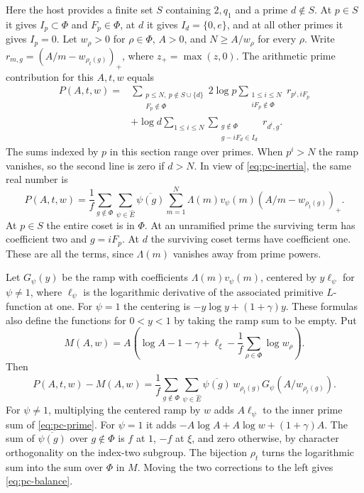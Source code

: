 Here the host provides a finite set \(S\) containing \(2,q_1\) and
a prime \(d\notin S\). At \(p\in S\) it gives \(I_p\subset\Phi\)
and \(F_p\in\Phi\), at \(d\) it gives \(I_d=\{0,e\}\), and at all
other primes it gives \(I_p=0\). Let \(w_\rho>0\) for \(\rho\in\Phi\),
\(A>0\), and \(N\geq A/w_\rho\) for every \(\rho\). Write
\(r_{m,g}=(A/m-w_{\rho_t(g)})_+\), where \(z_+=\max(z,0)\).
The arithmetic prime contribution for this \(A,t,w\) equals
\begin{align*}
 P(A,t,w)={}&\sum_{\substack{p\leq N,\ p\notin S\cup\{d\}\\ F_p\notin\Phi}}
  2\log p\sum_{\substack{1\leq i\leq N\\iF_p\notin\Phi}}r_{p^i,iF_p}\\
 &+\log d\sum_{1\leq i\leq N}
       \sum_{\substack{g\notin\Phi\\g-iF_d\in I_d}}r_{d^i,g}.
\end{align*}
The sums indexed by \(p\) in this section range over primes. When
\(p^i>N\) the ramp vanishes, so the second line is zero if \(d>N\).
In view of \eqref{eq:pc-inertia}, the same real number is
\begin{equation}
 P(A,t,w)=\frac1f\sum_{g\notin\Phi}\sum_{\psi\in\widehat E}
  \overline{\psi(g)}
  \sum_{m=1}^N\Lambda(m)v_\psi(m)(A/m-w_{\rho_t(g)})_+ .
 \label{eq:pc-prime}
\end{equation}
At \(p\in S\) the entire coset is in \(\Phi\). At an unramified
prime the surviving term has coefficient two and \(g=iF_p\).
At \(d\) the surviving coset terms have coefficient one. These are
all the terms, since \(\Lambda(m)\) vanishes away from prime powers.

Let \(G_\psi(y)\) be the ramp with coefficients \(\Lambda(m)v_\psi(m)\),
centered by \(y\ell_\psi\) for \(\psi\ne1\), where \(\ell_\psi\)
is the logarithmic derivative of the associated primitive \(L\)-function
at one. For \(\psi=1\) the centering is
\(-y\log y+(1+\gamma)y\). These formulas also define the functions
for \(0<y<1\) by taking the ramp sum to be empty. Put
\[
 M(A,w)=A\left(\log A-1-\gamma+\ell_\xi
                         -\frac1f\sum_{\rho\in\Phi}\log w_\rho\right).
\]
Then
\begin{equation}
 P(A,t,w)-M(A,w)
   =\frac1f\sum_{g\notin\Phi}\sum_{\psi\in\widehat E}
     \overline{\psi(g)}\,w_{\rho_t(g)}G_\psi(A/w_{\rho_t(g)}).
 \label{eq:pc-balance}
\end{equation}
For \(\psi\ne1\), multiplying the centered ramp by \(w\)
adds \(A\ell_\psi\) to the inner prime sum of \eqref{eq:pc-prime}.
For \(\psi=1\) it adds \(-A\log A+A\log w+(1+\gamma)A\).
The sum of \(\overline{\psi(g)}\) over \(g\notin\Phi\) is \(f\)
at \(1\), \(-f\) at \(\xi\), and zero otherwise, by character
orthogonality on the index-two subgroup. The bijection \(\rho_t\)
turns the logarithmic sum into the sum over \(\Phi\) in \(M\).
Moving the two corrections to the left gives \eqref{eq:pc-balance}.

